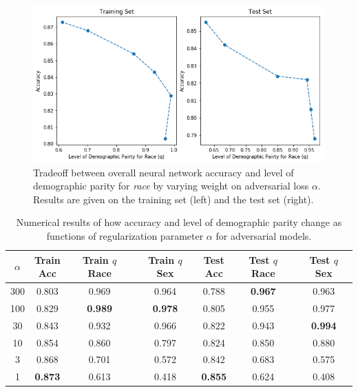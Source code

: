 \documentclass{article}
\begin{document}
\begin{figure}[ht]
	\vskip 0.2in
	\begin{center}
		\centerline{\includegraphics[width=\columnwidth]{img/adv_levels_race.png}}
		\caption{Tradeoff between overall neural network accuracy and level of demographic parity for \emph{race} by varying weight on adversarial loss $\alpha$. Results are given on the training set (left) and the test set (right).}
		\label{adv_fig_race}
	\end{center}
	\vskip -0.2in
\end{figure}

\begin{table}[!ht]
	\centering
	\begin{tabular}{c|ccc |ccc} 
		\hline
		\hline
		$\alpha$ & \shortstack{Train \\ Acc}  & \shortstack{Train  $q$ \\ Race} & \shortstack{Train  $q$ \\ Sex} & \shortstack{Test \\ Acc} & \shortstack{Test $q$ \\ Race} & \shortstack{Test $q$ \\ Sex} \\ 
		\hline
		300 & 0.803 & 0.969 & 0.964 & 0.788 & \textbf{0.967} & 0.963 \\ 
		100 & 0.829 & \textbf{0.989} & \textbf{0.978} & 0.805 & 0.955 & 0.977 \\
		30 & 0.843 & 0.932 & 0.966 & 0.822 & 0.943 & \textbf{0.994} \\
		10 & 0.854 & 0.860 & 0.797 & 0.824 & 0.850 & 0.880 \\
		3 & 0.868 & 0.701 & 0.572 & 0.842 & 0.683 & 0.575 \\ 
		1 & \textbf{0.873} & 0.613 & 0.418 & \textbf{0.855} & 0.624 & 0.408 \\
		\hline
	\end{tabular}
	\caption{Numerical results of how accuracy and level of demographic parity change as functions of regularization parameter $\alpha$ for adversarial models.} 
	\label{adv-table}
\end{table}
\end{document}
